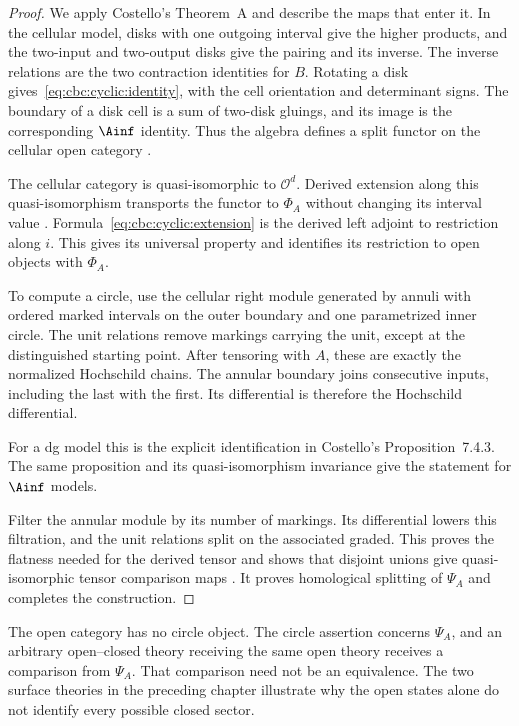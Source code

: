 \begin{proof}
We apply Costello's Theorem~A and describe the maps that enter it.
In the cellular model, disks with one outgoing interval give the higher products, and the two-input and two-output disks give the pairing and its inverse.
The inverse relations are the two contraction identities for $B$.
Rotating a disk gives~\eqref{eq:cbc:cyclic:identity}, with the cell orientation and determinant signs.
The boundary of a disk cell is a sum of two-disk gluings, and its image is the corresponding $\Ainf$ identity.
Thus the algebra defines a split functor on the cellular open category \cite[Theorem~6.2.3 and Lemma~7.3.2]{CostelloCY}.

The cellular category is quasi-isomorphic to $\mathcal O^d$.
Derived extension along this quasi-isomorphism transports the functor to $\Phi_A$ without changing its interval value \cite[Lemmas~6.1.7 and 7.3.4]{CostelloCY}.
Formula~\eqref{eq:cbc:cyclic:extension} is the derived left adjoint to restriction along $i$.
This gives its universal property and identifies its restriction to open objects with $\Phi_A$.

To compute a circle, use the cellular right module generated by annuli with ordered marked intervals on the outer boundary and one parametrized inner circle.
The unit relations remove markings carrying the unit, except at the distinguished starting point.
After tensoring with $A$, these are exactly the normalized Hochschild chains.
The annular boundary joins consecutive inputs, including the last with the first.
Its differential is therefore the Hochschild differential.

For a dg model this is the explicit identification in Costello's Proposition~7.4.3.
The same proposition and its quasi-isomorphism invariance give the statement for $\Ainf$ models.

Filter the annular module by its number of markings.
Its differential lowers this filtration, and the unit relations split on the associated graded.
This proves the flatness needed for the derived tensor and shows that disjoint unions give quasi-isomorphic tensor comparison maps \cite[Lemma~6.3.1]{CostelloCY}.
It proves homological splitting of $\Psi_A$ and completes the construction.
\end{proof}

The open category has no circle object.
The circle assertion concerns $\Psi_A$, and an arbitrary open--closed theory receiving the same open theory receives a comparison from $\Psi_A$.
That comparison need not be an equivalence.
The two surface theories in the preceding chapter illustrate why the open states alone do not identify every possible closed sector.

